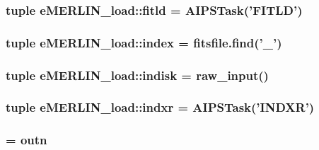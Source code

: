 \hypertarget{namespacee_m_e_r_l_i_n__load_ae0faabbb35af280be9b9329979f9e782}{
\subsubsection[{fitld}]{\setlength{\rightskip}{0pt plus 5cm}tuple {\bf e\-M\-E\-R\-L\-I\-N\-\_\-load\-::fitld} = \-A\-I\-P\-S\-Task('\-F\-I\-T\-L\-D')}}\label{namespacee_m_e_r_l_i_n__load_ae0faabbb35af280be9b9329979f9e782}
\hypertarget{namespacee_m_e_r_l_i_n__load_af2bd25598bd280e936345cb1fdb1f0a8}{
\subsubsection[{index}]{\setlength{\rightskip}{0pt plus 5cm}tuple {\bf e\-M\-E\-R\-L\-I\-N\-\_\-load\-::index} = fitsfile.\-find('\-\_\-')}}\label{namespacee_m_e_r_l_i_n__load_af2bd25598bd280e936345cb1fdb1f0a8}
\hypertarget{namespacee_m_e_r_l_i_n__load_af5dbb7c985275442e06db7e9c4d2ed57}{
\subsubsection[{indisk}]{\setlength{\rightskip}{0pt plus 5cm}tuple {\bf e\-M\-E\-R\-L\-I\-N\-\_\-load\-::indisk} = raw\-\_\-input()}}\label{namespacee_m_e_r_l_i_n__load_af5dbb7c985275442e06db7e9c4d2ed57}
\hypertarget{namespacee_m_e_r_l_i_n__load_a903f4b4390c6d8095ee9dd8dfc21f36a}{
\subsubsection[{indxr}]{\setlength{\rightskip}{0pt plus 5cm}tuple {\bf e\-M\-E\-R\-L\-I\-N\-\_\-load\-::indxr} = \-A\-I\-P\-S\-Task('\-I\-N\-D\-X\-R')}}\label{namespacee_m_e_r_l_i_n__load_a903f4b4390c6d8095ee9dd8dfc21f36a}
\hypertarget{namespacee_m_e_r_l_i_n__load_a3bb206e5b5466d47c10d6b459442d825}{
\subsubsection[{inname}]{ = {\bf outn}}}\label{namespacee_m_e_r_l_i_n__load_a3bb206e5b5466d47c10d6b459442d825}
